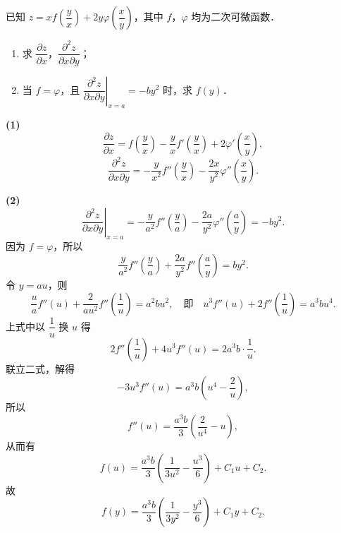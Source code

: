 已知 $z=xf\left(\dfrac{y}{x}\right)+2y\varphi\left(\dfrac{x}{y}\right)$，其中 $f$，$\varphi$ 均为二次可微函数．
\begin{enumerate}
  \item 求 $\dfrac{\partial z}{\partial x}$，$\dfrac{\partial^2 z}{\partial x\partial y}$；
  \item 当 $f=\varphi$，且 $\left.\dfrac{\partial^2 z}{\partial x\partial y}\right|_{x=a}=-by^2$ 时，求 $f(y)$．
\end{enumerate}
\begin{solution}
\textbf{(1)}
\[
  \frac{\partial z}{\partial x}=f\left(\frac{y}{x}\right)-\frac{y}{x}f'\left(\frac{y}{x}\right)+2\varphi'\left(\frac{x}{y}\right),
\]
\[
  \frac{\partial^2 z}{\partial x\partial y}
  =-\frac{y}{x^2}f''\left(\frac{y}{x}\right)-\frac{2x}{y^2}\varphi''\left(\frac{x}{y}\right).
\]

\textbf{(2)}
\[
  \left.\frac{\partial^2 z}{\partial x\partial y}\right|_{x=a}
  =-\frac{y}{a^2}f''\left(\frac{y}{a}\right)-\frac{2a}{y^2}\varphi''\left(\frac{a}{y}\right)
  =-by^2.
\]
因为 $f=\varphi$，所以
\[
  \frac{y}{a^2}f''\left(\frac{y}{a}\right)+\frac{2a}{y^2}f''\left(\frac{a}{y}\right)=by^2.
\]
令 $y=au$，则
\[
  \frac{u}{a}f''(u)+\frac{2}{au^2}f''\left(\frac{1}{u}\right)=a^2bu^2,
  \quad\text{即}\quad
  u^3f''(u)+2f''\left(\frac{1}{u}\right)=a^3bu^4.
\]
上式中以 $\dfrac{1}{u}$ 换 $u$ 得
\[
  2f''\left(\frac{1}{u}\right)+4u^3f''(u)=2a^3b\cdot\frac{1}{u}.
\]
联立二式，解得
\[
  -3u^3f''(u)=a^3b\left(u^4-\frac{2}{u}\right),
\]
所以
\[
  f''(u)=\frac{a^3b}{3}\left(\frac{2}{u^4}-u\right),
\]
从而有
\[
  f(u)=\frac{a^3b}{3}\left(\frac{1}{3u^2}-\frac{u^3}{6}\right)+C_1u+C_2.
\]
故
\[
  f(y)=\frac{a^3b}{3}\left(\frac{1}{3y^2}-\frac{y^3}{6}\right)+C_1y+C_2.
\]
\end{solution}

